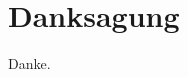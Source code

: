 \thispagestyle{empty}
\section{Danksagung}
\vspace*{1em}


\vspace*{3em}

Danke.
    
\vspace*{3em}
